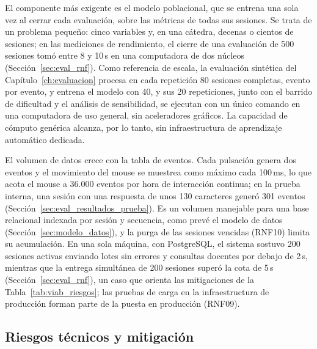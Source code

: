 El componente más exigente es el modelo poblacional, que se entrena una sola vez al cerrar cada evaluación, sobre las métricas de todas sus sesiones. Se trata de un problema pequeño: cinco variables y, en una cátedra, decenas o cientos de sesiones; en las mediciones de rendimiento, el cierre de una evaluación de 500 sesiones tomó entre 8 y 10\,s en una computadora de dos núcleos (Sección~\ref{sec:eval_rnf}). Como referencia de escala, la evaluación sintética del Capítulo~\ref{ch:evaluacion} procesa en cada repetición 80 sesiones completas, evento por evento, y entrena el modelo con 40, y sus 20 repeticiones, junto con el barrido de dificultad y el análisis de sensibilidad, se ejecutan con un único comando en una computadora de uso general, sin aceleradores gráficos. La capacidad de cómputo genérica alcanza, por lo tanto, sin infraestructura de aprendizaje automático dedicada.

El volumen de datos crece con la tabla de eventos. Cada pulsación genera dos eventos y el movimiento del mouse se muestrea como máximo cada 100\,ms, lo que acota el mouse a 36.000 eventos por hora de interacción continua; en la prueba interna, una sesión con una respuesta de unos 130 caracteres generó 301 eventos (Sección~\ref{sec:eval_resultados_prueba}). Es un volumen manejable para una base relacional indexada por sesión y secuencia, como prevé el modelo de datos (Sección~\ref{sec:modelo_datos}), y la purga de las sesiones vencidas (RNF10) limita su acumulación. En una sola máquina, con PostgreSQL, el sistema sostuvo 200 sesiones activas enviando lotes sin errores y consultas docentes por debajo de 2\,s, mientras que la entrega simultánea de 200 sesiones superó la cota de 5\,s (Sección~\ref{sec:eval_rnf}), un caso que orienta las mitigaciones de la Tabla~\ref{tab:viab_riesgos}; las pruebas de carga en la infraestructura de producción forman parte de la puesta en producción (RNF09).

\subsection{Riesgos técnicos y mitigación}

